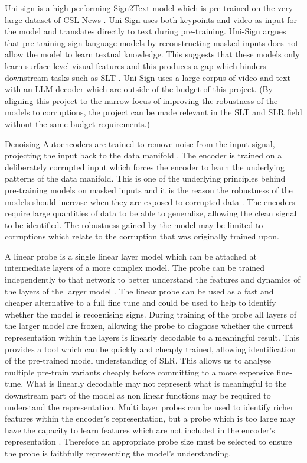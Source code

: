 \documentclass{article}
\begin{document}
Uni-sign is a high performing Sign2Text model which is pre-trained on the very large dataset of CSL-News \cite{li_uni-sign_2025}. Uni-Sign uses both keypoints and video as input for the model and translates directly to text during pre-training. Uni-Sign argues that pre-training sign language models by reconstructing masked inputs does not allow the model to learn textual knowledge. This suggests that these models only learn surface level visual features and this produces a gap which hinders downstream tasks such as SLT \cite{li_uni-sign_2025} \cite{gueuwou_shubert_2025}. Uni-Sign uses a large corpus of video and text with an LLM decoder which are outside of the budget of this project. (By aligning this project to the narrow focus of improving the robustness of the models to corruptions, the project can be made relevant in the SLT and SLR field without the same budget requirements.) 

Denoising Autoencoders are trained to remove noise from the input signal, projecting the input back to the data manifold \cite{vincent_extracting_2008}. The encoder is trained on a deliberately corrupted input which forces the encoder to learn the underlying patterns of the data manifold. This is one of the underlying principles behind pre-training models on masked inputs and it is the reason the robustness of the models should increase when they are exposed to corrupted data  \cite{vincent_extracting_2008}. The encoders require large quantities of data to be able to generalise, allowing the clean signal to be identified. The robustness gained by the model may be limited to corruptions which relate to the corruption that was originally trained upon. 

A linear probe is a single linear layer model which can be attached at intermediate layers of a more complex model. The probe can be trained independently to that network to better understand the features and dynamics of the layers of the larger model \cite{alain_understanding_2018}. The linear probe can be used as a fast and cheaper alternative to a full fine tune and could be used to help to identify whether the model is recognising signs. During training of the probe all layers of the larger model are frozen, allowing the probe to diagnose whether the current representation within the layers is linearly decodable to a meaningful result. This provides a tool which can be quickly and cheaply trained, allowing identification of the pre-trained model understanding of SLR. This allows us to analyse multiple pre-train variants cheaply before committing to a more expensive fine-tune. What is linearly decodable may not represent what is meaningful to the downstream part of the model as non linear functions may be required to understand the representation. Multi layer probes can be used to identify richer features within the encoder's representation, but a probe which is too large may have the capacity to learn features which are not included in the encoder's representation \cite{hewitt_designing_2019}. Therefore an appropriate probe size must be selected to ensure the probe is faithfully representing the model's understanding.
\end{document}
